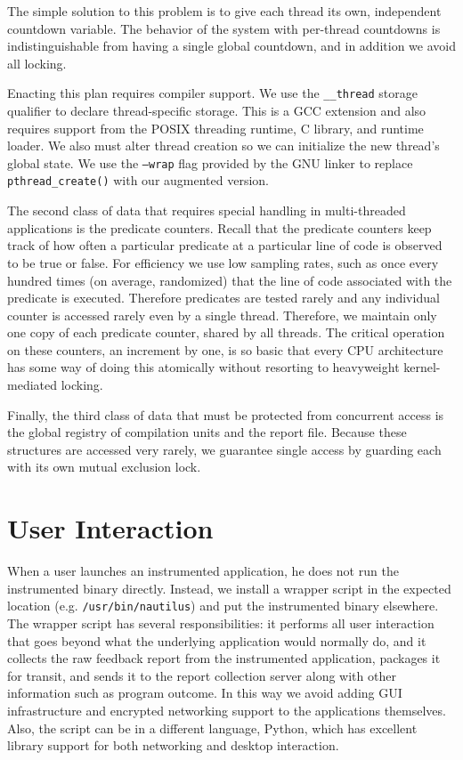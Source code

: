 \documentclass[10pt,twocolumn]{article}
\begin{document}
The simple solution to this problem is to give each thread its own,
independent countdown variable.  The behavior of the system with per-thread
countdowns is indistinguishable from having a single global countdown,
and in addition we avoid all locking.

Enacting this plan requires compiler support.  We use the
\texttt{\_\_thread} storage qualifier to declare thread-specific
storage.  This is a GCC extension and also requires support from the
POSIX threading runtime, C library, and runtime loader.  We also must
alter thread creation so we can initialize the new thread's global
state.  We use the \texttt{--wrap} flag provided by the GNU linker to
replace \texttt{pthread\_create()} with our augmented version.

The second class of data that requires special handling in
multi-threaded applications is the predicate counters.  Recall that
the predicate counters keep track of how often a particular predicate
at a particular line of code is observed to be true or false.  For
efficiency we use low sampling rates, such as once every hundred times
(on average, randomized) that the line of code associated with the
predicate is executed.  Therefore predicates are tested rarely and any
individual counter is accessed rarely even by a single thread.
Therefore, we maintain only one copy of each predicate counter, shared
by all threads.  The critical operation on these counters, an
increment by one, is so basic that every CPU architecture has some way
of doing this atomically without resorting to heavyweight
kernel-mediated locking.

Finally, the third class of data that must be protected from concurrent access
is the global registry of compilation units and the report file.
Because these structures are accessed very rarely, we guarantee single 
access by guarding each with its own mutual exclusion lock.


\section{User Interaction}

When a user launches an instrumented application, he does not run the
instrumented binary directly.  Instead, we install a wrapper script in
the expected location (e.g. \texttt{/usr/bin/nautilus}) and put the
instrumented binary elsewhere.  The wrapper script has several
responsibilities:  it performs all user interaction
that goes beyond what the underlying application would normally do, and
it collects the raw feedback report from the instrumented
application, packages it for transit, and sends it to the report
collection server along with other information such as program
outcome.  In this way we avoid adding GUI infrastructure and
encrypted networking support to the applications themselves.
Also, the script can be in a different language, Python,
which has excellent library support for both networking and desktop
interaction.
\end{document}
